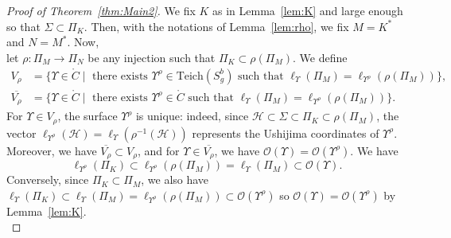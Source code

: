 \documentclass[a4paper,12pt]{article}
\theoremstyle{definition}
\theoremstyle{remark}
\begin{document}
\begin{proof}[Proof of Theorem~\ref{thm:Main2}]
    We fix $K$ as in Lemma~\ref{lem:K} and large enough so that $\Sigma \subset \Pi_K$. Then, with the notations of Lemma~\ref{lem:rho}, we fix $M=K^*$ and $N=M^*$. 
    Now, \\
    let $\rho : \Pi_M \to \Pi_N$ be any injection such that $\Pi_K \subset \rho (\Pi_M)$. We define
    \begin{align*}
        V_{\rho} & =\{\Upsilon \in \mathring{C} \mid\text{ there exists } \Upsilon^{\rho} \in \mathrm{Teich}(S_g^b) \text{ such that } \ell_{\Upsilon} (\Pi_M) = \ell_{\Upsilon^{\rho}} ( \rho (\Pi_M))\},\\
        \overline{V_{\rho}} &  =\{\Upsilon \in \mathring{C} \mid\text{ there exists } \Upsilon^{\rho} \in \mathring{C} \text{ such that } \ell_{\Upsilon} (\Pi_M) = \ell_{\Upsilon^{\rho}} ( \rho (\Pi_M))\}.
    \end{align*}
    For $\Upsilon \in V_{\rho} $, the surface $\Upsilon^{\rho} $ is unique: indeed, since \mbox{$\mathcal{H} \subset \Sigma \subset \Pi_K \subset \rho (\Pi_M)$}, the vector $\ell_{\Upsilon^{\rho}} (\mathcal{H} )= \ell_{\Upsilon} (\rho^{-1}(\mathcal{H}))  $ represents the Ushijima coordinates of $\Upsilon^{\rho}$. Moreover, we have $\overline{V_{\rho}} \subset V_{\rho}$, and for $\Upsilon \in \overline{V_{\rho}} $, we have $\mathcal{O}(\Upsilon)=\mathcal{O}(\Upsilon^{\rho} ) $. We have
    \[
        \ell_{\Upsilon^{\rho}} (\Pi_K ) \subset \ell_{\Upsilon^{\rho}} (\rho (\Pi_M))=\ell_{\Upsilon} (\Pi_M) \subset \mathcal{O}(\Upsilon) .
    \]
    Conversely, since $\Pi_K \subset \Pi_M$, we also have $\ell_{\Upsilon} (\Pi_K) \subset \ell_{\Upsilon} (\Pi_M) = \ell_{\Upsilon^{\rho}} (\rho(\Pi_M)) \subset \mathcal{O}(\Upsilon^{\rho}) $ so $\mathcal{O}(\Upsilon)=\mathcal{O}(\Upsilon^{\rho})$ by Lemma~\ref{lem:K}. \\
    

\end{proof}
\end{document}
